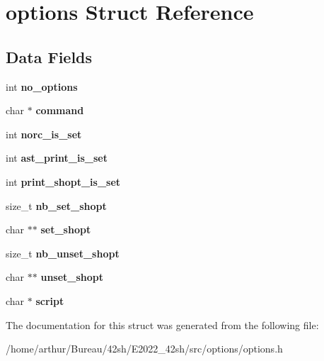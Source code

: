 \hypertarget{structoptions}{}\section{options Struct Reference}
\label{structoptions}
\subsection*{Data Fields}
\begin{DoxyCompactItemize}
\item 
\mbox{\label{structoptions_a33ffdf71f40b8fd12c79f1ebd2e74cb4}} 
int {\bfseries no\+\_\+options}
\item 
\mbox{\label{structoptions_ade9cba72805fe52685a1deea307a8e82}} 
char $\ast$ {\bfseries command}
\item 
\mbox{\label{structoptions_ad62c635317c683d35dc1bd0fd16c2c43}} 
int {\bfseries norc\+\_\+is\+\_\+set}
\item 
\mbox{\label{structoptions_a41608cac9f56acac42fa77a6b1d6c2b2}} 
int {\bfseries ast\+\_\+print\+\_\+is\+\_\+set}
\item 
\mbox{\label{structoptions_a2c1c343f0f63791524f2b4285f114da6}} 
int {\bfseries print\+\_\+shopt\+\_\+is\+\_\+set}
\item 
\mbox{\label{structoptions_a438a32a4aee890bf61e0ce74fb1c955f}} 
size\+\_\+t {\bfseries nb\+\_\+set\+\_\+shopt}
\item 
\mbox{\label{structoptions_aca89f51e55479537bd9893bf58b627f0}} 
char $\ast$$\ast$ {\bfseries set\+\_\+shopt}
\item 
\mbox{\label{structoptions_a5acb66fb0c81450e6c1bbcc850d8ca65}} 
size\+\_\+t {\bfseries nb\+\_\+unset\+\_\+shopt}
\item 
\mbox{\label{structoptions_aeed017b598c93520ec79096337eab4af}} 
char $\ast$$\ast$ {\bfseries unset\+\_\+shopt}
\item 
\mbox{\label{structoptions_a215b2b0b4c505ae5c7d6e6b1b3b9b0dc}} 
char $\ast$ {\bfseries script}
\end{DoxyCompactItemize}


The documentation for this struct was generated from the following file\+:\begin{DoxyCompactItemize}
\item 
/home/arthur/\+Bureau/42sh/\+E2022\+\_\+42sh/src/options/options.\+h\end{DoxyCompactItemize}
